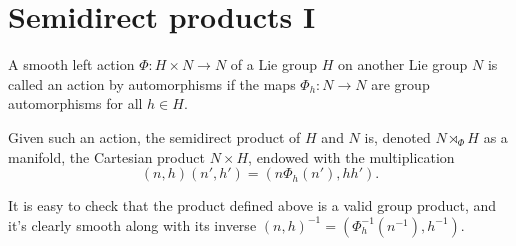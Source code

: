






\section{Semidirect products I}\label{sec: semidirect products i}

\begin{defn}
    A smooth left action $\Phi:H\times N\to N$ of a Lie group $H$ on another Lie group $N$ is called an action by automorphisms if the maps $\Phi_h:N\to N$ are group automorphisms for all $h\in H$. 

    Given such an action, the semidirect product of $H$ and $N$ is, denoted $N\rtimes_\Phi H$ as a manifold, the Cartesian product $N\times H$, endowed with the multiplication
    \[(n,h)(n',h')=(n\Phi_h(n'),hh').\]
\end{defn}
It is easy to check that the product defined above is a valid group product, and it's clearly smooth along with its inverse $(n,h)^{-1}=(\Phi_h^{-1}(n^{-1}),h^{-1})$.

